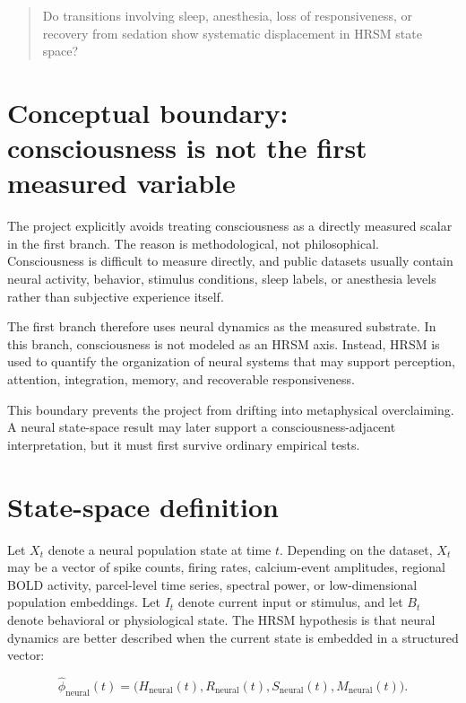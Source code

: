 \documentclass[11pt]{article}
\begin{document}
\begin{quote}
Do transitions involving sleep, anesthesia, loss of responsiveness, or recovery from sedation show systematic displacement in HRSM state space?
\end{quote}

\section{Conceptual boundary: consciousness is not the first measured variable}

The project explicitly avoids treating consciousness as a directly measured scalar in the first branch. The reason is methodological, not philosophical. Consciousness is difficult to measure directly, and public datasets usually contain neural activity, behavior, stimulus conditions, sleep labels, or anesthesia levels rather than subjective experience itself.

The first branch therefore uses neural dynamics as the measured substrate. In this branch, consciousness is not modeled as an HRSM axis. Instead, HRSM is used to quantify the organization of neural systems that may support perception, attention, integration, memory, and recoverable responsiveness.

This boundary prevents the project from drifting into metaphysical overclaiming. A neural state-space result may later support a consciousness-adjacent interpretation, but it must first survive ordinary empirical tests.

\section{State-space definition}

Let $X_t$ denote a neural population state at time $t$. Depending on the dataset, $X_t$ may be a vector of spike counts, firing rates, calcium-event amplitudes, regional BOLD activity, parcel-level time series, spectral power, or low-dimensional population embeddings. Let $I_t$ denote current input or stimulus, and let $B_t$ denote behavioral or physiological state. The HRSM hypothesis is that neural dynamics are better described when the current state is embedded in a structured vector:

\begin{equation}
\hat{\phi}_{\mathrm{neural}}(t) = \bigl(H_{\mathrm{neural}}(t), R_{\mathrm{neural}}(t), S_{\mathrm{neural}}(t), M_{\mathrm{neural}}(t)\bigr).
\end{equation}
\end{document}
